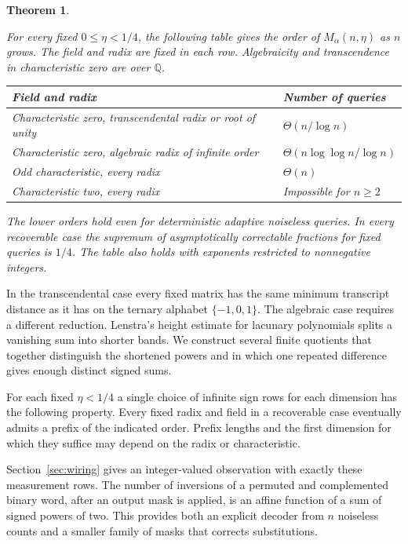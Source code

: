 \documentclass[11pt,letterpaper]{article}
\newtheorem{theorem}{Theorem}[section]
\numberwithin{equation}{section}
\begin{document}
\begin{theorem}\label{thm:class}

For every fixed $0\le\eta<1/4$, the following table gives the order of $M_\alpha(n,\eta)$ as
$n$ grows. The field and radix are fixed in each row. Algebraicity and transcendence in
characteristic zero are over $\mathbb Q$.

\begin{center}\normalfont
\begin{tabularx}{\linewidth}{@{}Xl@{}}
\toprule
Field and radix & Number of queries \\
\midrule
Characteristic zero, transcendental radix or root of unity & $\Theta(n/\log n)$ \\
Characteristic zero, algebraic radix of infinite order & $\Theta(n\log\log n/\log n)$ \\
Odd characteristic, every radix & $\Theta(n)$ \\
Characteristic two, every radix & Impossible for $n\ge2$ \\
\bottomrule
\end{tabularx}
\end{center}

The lower orders hold even for deterministic adaptive noiseless queries. In every recoverable
case the supremum of asymptotically correctable fractions for fixed queries is $1/4$. The
table also holds with exponents restricted to nonnegative integers.
\end{theorem}

In the transcendental case every fixed matrix has the same minimum transcript distance as it
has on the ternary alphabet $\{-1,0,1\}$. The algebraic case requires a different reduction.
Lenstra's height estimate for lacunary polynomials \cite{lenstra} splits a vanishing sum into
shorter bands. We construct several finite quotients that together distinguish the shortened
powers and in which one repeated difference gives enough distinct signed sums.

For each fixed $\eta<1/4$ a single choice of infinite sign rows for each dimension has the
following property. Every fixed radix and field in a recoverable case eventually admits a
prefix of the indicated order. Prefix lengths and the first dimension for which they suffice
may depend on the radix or characteristic.

Section~\ref{sec:wiring} gives an integer-valued observation with exactly these measurement
rows. The number of inversions of a permuted and complemented binary word, after an output
mask is applied, is an affine function of a sum of signed powers of two. This provides both an
explicit decoder from $n$ noiseless counts and a smaller family of masks that corrects
substitutions.
\end{document}
